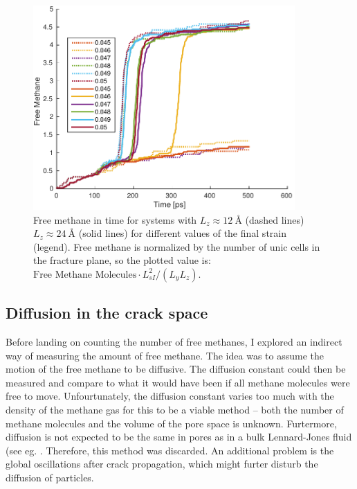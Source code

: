 \begin{figure}
\centering
\includegraphics[width=10cm]{../figures/thesis/free_methane_nz1_nz2.pdf}
\caption{Free methane in time for systems with $L_z \approx \SI{12}{\angstrom}$ (dashed lines) $L_z\approx \SI{24}{\angstrom}$ (solid lines) for different values of the final strain (legend). Free methane is normalized by the number of unic cells in the fracture plane, so the plotted value is: $\text{Free Methane Molecules}\cdot L_{sI}^2/(L_yL_z)$.}
\label{fig:free_methane_diff_l}
\end{figure}

\subsection{Diffusion in the crack space}
Before landing on counting the number of free methanes, I explored an indirect way of measuring the amount of free methane. The idea was to assume the motion of the free methane to be diffusive. The diffusion constant could then be measured and compare to what it would have been if all methane molecules were free to move. Unfourtunately, the diffusion constant varies too much with the density of the methane gas for this to be a viable method -- both the number of methane molecules and the volume of the pore space is unknown. Furtermore, diffusion is not expected to be the same in pores as in a bulk Lennard-Jones fluid (see eg. \citet[p. 18]{Pozhar:1668293}. Therefore, this method was discarded. An additional problem is the global oscillations after crack propagation, which might furter disturb the diffusion of particles. 

